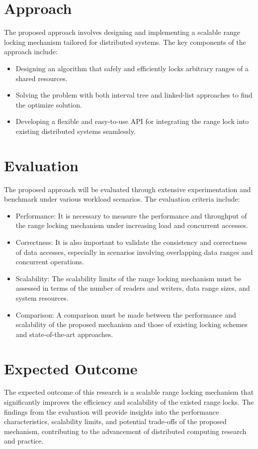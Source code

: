 \section{Approach}
The proposed approach involves designing and implementing a scalable range locking mechanism tailored for distributed systems. The key components of the approach include:
\begin{itemize}
    \item Designing an algorithm that safely and efficiently locks arbitrary ranges of a shared resources.
    \item Solving the problem with both interval tree and linked-list approaches to find the optimize solution.
    \item Developing a flexible and easy-to-use API for integrating the range lock into existing distributed systems seamlessly.
\end{itemize}

\section{Evaluation}
The proposed approach will be evaluated through extensive experimentation and benchmark under various workload scenarios. The evaluation criteria include:
\begin{itemize}
    \item Performance: It is necessary to measure the performance and throughput of the range locking mechanism under increasing load and concurrent accesses.
    \item Correctness: It is also important to validate the consistency and correctness of data accesses, especially in scenarios involving overlapping data ranges and concurrent operations.
    \item Scalability:  The scalability limits of the range locking mechanism must be assessed in terms of the number of readers and writers, data range sizes, and system resources.
    \item Comparison: A comparison must be made between the performance and scalability of the proposed mechanism and those of existing locking schemes and state-of-the-art approaches.
\end{itemize}

\section{Expected Outcome}
The expected outcome of this research is a scalable range locking mechanism that significantly improves the efficiency and scalability of the existed range locks. The findings from the evaluation will provide insights into the performance characteristics, scalability limits, and potential trade-offs of the proposed mechanism, contributing to the advancement of distributed computing research and practice.

